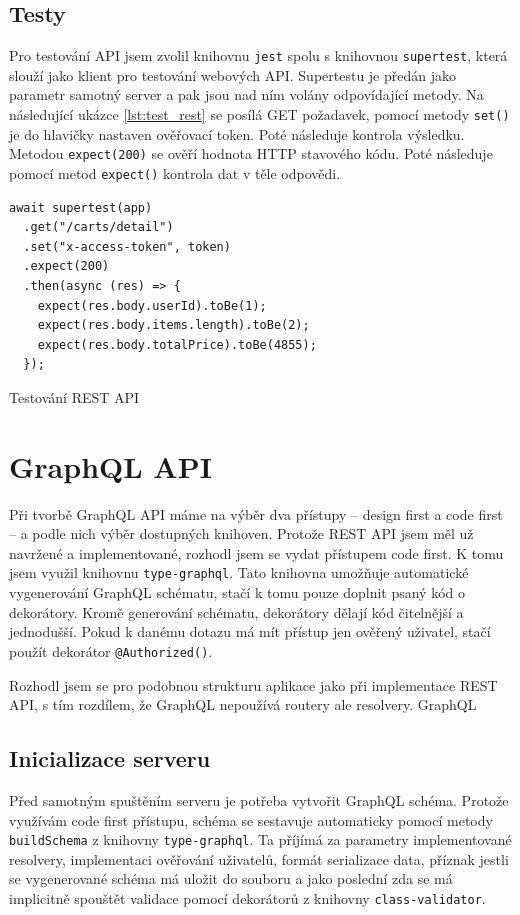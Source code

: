 \documentclass[thesis=M,czech]{FITthesis}[2019/12/23]
\begin{document}
\subsection{Testy}
Pro testování API jsem zvolil knihovnu \texttt{jest} spolu s knihovnou \texttt{supertest}, která slouží jako klient pro testování webových API. Supertestu je předán jako parametr samotný server a pak jsou nad ním volány odpovídající metody. Na následující ukázce \ref{lst:test_rest} se posílá GET požadavek, pomocí metody \texttt{set()} je do hlavičky nastaven ověřovací token. Poté následuje kontrola výsledku. Metodou \texttt{expect(200)} se ověří hodnota HTTP stavového kódu. Poté následuje pomocí metod \texttt{expect()} kontrola dat v těle odpovědi.

\begin{listing}[H]
\begin{verbatim}
await supertest(app)
  .get("/carts/detail")
  .set("x-access-token", token)
  .expect(200)
  .then(async (res) => {
    expect(res.body.userId).toBe(1);
    expect(res.body.items.length).toBe(2);
    expect(res.body.totalPrice).toBe(4855);
  });
\end{verbatim}
\caption{Testování REST API}
\label{lst:test_rest}
\end{listing}


\section{GraphQL API}
Při tvorbě GraphQL API máme na výběr dva přístupy -- design first a code first -- a podle nich výběr dostupných knihoven. Protože REST API jsem měl už navržené a implementované, rozhodl jsem se vydat přístupem code first. K tomu jsem využil knihovnu \texttt{type-graphql}. Tato knihovna umožňuje automatické vygenerování GraphQL schématu, stačí k tomu pouze doplnit psaný kód o dekorátory. Kromě generování schématu, dekorátory dělají kód čitelnější a jednodušší. Pokud k danému dotazu má mít přístup jen ověřený uživatel, stačí použít dekorátor \texttt{@Authorized()}.

Rozhodl jsem se pro podobnou strukturu aplikace jako při implementace REST API, s tím rozdílem, že GraphQL nepoužívá routery ale resolvery. GraphQL

\subsection{Inicializace serveru}
Před samotným spuštěním serveru je potřeba vytvořit GraphQL schéma. Protože využívám code first přístupu, schéma se sestavuje automaticky pomocí metody \texttt{buildSchema} z knihovny \texttt{type-graphql}. Ta příjímá za parametry implementované resolvery, implementaci ověřování uživatelů, formát serializace data, příznak jestli se vygenerované schéma má uložit do souboru a jako poslední zda se má implicitně spouštět validace pomocí dekorátorů z knihovny \texttt{class-validator}.
\end{document}
